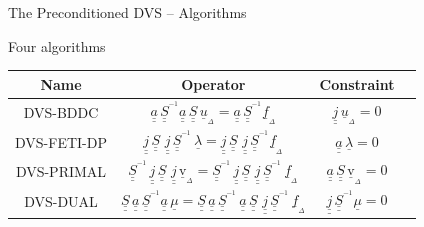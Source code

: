 \documentclass[handout]{beamer}
\newcommand{\Matriz}[1]{\underline{\underline{#1}}}
\newcommand{\InvSchur}{\Matriz{S}^{^{-1}}}
\newcommand{\Schur}{\Matriz{S}}
\newcommand{\Vector}[1]{\underline{#1}}
\newcommand{\VectorD}[1]{\underline{#1}_{_\Delta}}
\begin{document}
\begin{frame}{The Preconditioned DVS -- Algorithms}

\begin{block}{Four algorithms}

{\small{
\begin{tabular}{|c|c|c|c|}
\hline
Name & Operator & Constraint \\
\hline
\hline
DVS-BDDC &
$\displaystyle 
\Matriz{a} \, \InvSchur  \Matriz{a} \, \Schur \, \VectorD{u} =
\Matriz{a} \, \InvSchur  \VectorD{f}$ &
 $\Matriz{j} \, \VectorD{u} = 0$ \\
\hline
\hline
DVS-FETI-DP & 
$\displaystyle 
\Matriz{j} \, \Schur \,\, \Matriz{j} \, \InvSchur \, \Vector{\lambda} =
\Matriz{j} \, \Schur \,\, \Matriz{j} \, \InvSchur  \VectorD{f}$ &
 $\Matriz{a} \, \Vector{\lambda} = 0$ \\
\hline
\hline
DVS-PRIMAL & 
$\displaystyle 
\InvSchur \, \Matriz{j} \, \Schur \,\, \Matriz{j} \, \VectorD{\mathrm{v}} =
\InvSchur \, \Matriz{j} \, \Schur \,\, \Matriz{j} \, \InvSchur \, \VectorD{f}$ &
 $\Matriz{a} \, \Schur \, \VectorD{\mathrm{v}} = 0$ \\
\hline
\hline
DVS-DUAL &
$\displaystyle 
\Schur \, \Matriz{a} \, \InvSchur  \Matriz{a} \, \Vector{\mu} =
\Schur \, \Matriz{a} \, \InvSchur \, \Matriz{a} \, \Schur \,\, \Matriz{j} \, \InvSchur \, \VectorD{f}$ &
 $\Matriz{j} \, \InvSchur \Vector{\mu} = 0$ \\
\hline
\end{tabular}
}}
\end{block}

\end{frame}
\end{document}
